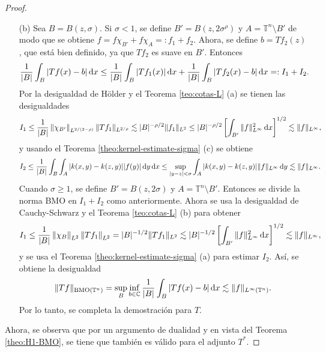 \begin{proof}
\begin{itemize}
		\item[(b)] Sea $B = B(z, \sigma)$. Si $\sigma < 1$, se define $B'=B(z, 2\sigma^\rho)$ y $A = \mathbb{T}^n\setminus B'$ de modo que se obtiene $f = f\chi_{B'} + f\chi_A =: f_1 + f_2$. Ahora, se define $b = Tf_2(z)$, que está bien definido, ya que $Tf_2$ es suave en $B'$. Entonces 
		\begin{equation*}
			\frac{1}{|B|}\int_B|Tf(x) - b| \mathop{}\!\mathrm{d} x \leq \frac{1}{|B|}\int_B|Tf_1(x)|\mathop{}\!\mathrm{d} x + \frac{1}{|B|}\int_B|Tf_2(x) -b|\mathop{}\!\mathrm{d} x =: I_1 + I_2.
		\end{equation*}
		Por la desigualdad de H\"older y el Teorema \ref{teo:cotas-L} (a) se tienen las desigualdades
		\begin{equation*}
			I_1 \leq \frac{1}{|B|}\left\|\chi_{B'}\right\|_{L^{2/(2-\rho)}}\|Tf_1\|_{L^{2/\rho}}
			\lesssim |B|^{-\rho/2}\|f_1\|_{L^2} \leq |B|^{-\rho/2}\left[\int_{B'}\|f\|^2_{L^\infty}\mathop{}\!\mathrm{d} x\right]^{1/2} \lesssim  \|f\|_{L^\infty},
		\end{equation*}
		y usando el Teorema \ref{theo:kernel-estimate-sigma} (c) se obtiene 
		\begin{equation*}
			I_2 \leq \frac{1}{|B|}\int_B\int_A|k(x, y) - k(z, y)||f(y)|\mathop{}\!\mathrm{d} y \mathop{}\!\mathrm{d} x \leq \sup_{|y-z|<\sigma}\int_A|k(x, y) - k(z, y)|\|f\|_{L^\infty} \mathop{}\!\mathrm{d} y \lesssim \|f\|_{L^\infty}.
		\end{equation*}
		Cuando $\sigma \geq 1$, se define $B'=B(z, 2\sigma)$ y $A = \mathbb{T}^n\setminus B'$. Entonces se divide la norma BMO en $I_1 + I_2$ como anteriormente. Ahora se usa la desigualdad de Cauchy-Schwarz y el Teorema  \ref{teo:cotas-L} (b) para obtener
		\begin{equation*}
			I_1 \leq\frac{1}{|B|} \left\|\chi_B\right\|_{L^2}\left\|Tf_1\right\|_{L^2} = |B|^{-1/2}\|Tf_1\|_{L^2} \lesssim |B|^{-1/2}\left[\int_{B'}\|f\|^2_{L^\infty}\mathop{}\!\mathrm{d} x\right]^{1/2} \lesssim  \|f\|_{L^\infty},
		\end{equation*}
		y se usa el Teorema \ref{theo:kernel-estimate-sigma} (a) para estimar $I_2$. Así, se obtiene la desigualdad
		\begin{equation*}
			\|Tf\|_{\mathrm{BMO}(\mathbb{T}^n)} = \sup_B \inf_{b\in \mathbb{C}} \frac{1}{|B|} \int_B |Tf(x) - b|\mathop{}\!\mathrm{d} x \lesssim \|f\|_{L^\infty(\mathbb{T}^n)}.
		\end{equation*}
		Por lo tanto, se completa la demostración para $T$. 
	\end{itemize}  
	Ahora, se observa que por un argumento de dualidad y en vista del Teorema \ref{theo:H1-BMO}, se tiene que también es válido para el adjunto $T^*$.
\end{proof}
